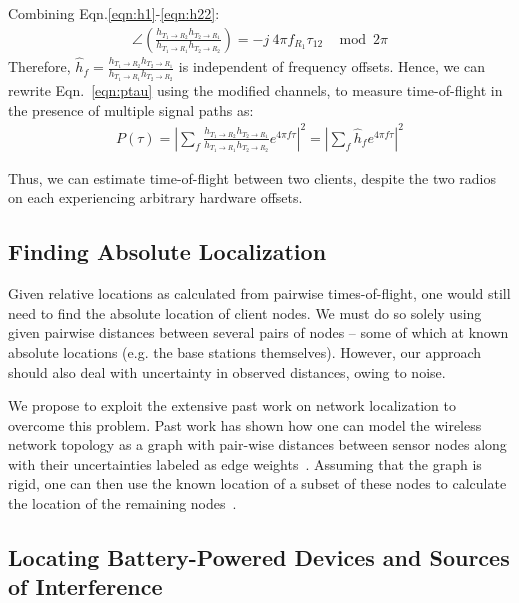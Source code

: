 Combining Eqn.\ref{eqn:h1}-\ref{eqn:h22}:
\begin{align}
\angle \left(\frac{h_{T_1 \rightarrow R_2} h_{T_2 \rightarrow R_1}}{h_{T_1 \rightarrow R_1} h_{T_2 \rightarrow R_2}} \right) = -j~4 \pi f_{R_1} \tau_{12} ~~\mod 2\pi \label{eqn:h4}
\end{align}
Therefore,  $\hat{h}_f = \frac{h_{T_1 \rightarrow R_2} h_{T_2 \rightarrow R_1}}{h_{T_1 \rightarrow R_1} h_{T_2 \rightarrow R_2}}$ is independent of frequency offsets. Hence, we can rewrite Eqn.~\ref{eqn:ptau} using the modified channels, to measure time-of-flight in the presence of multiple signal paths as:
\begin{align}
P(\tau) = \left|\sum_f \frac{h_{T_1 \rightarrow R_2} h_{T_2 \rightarrow R_1}}{h_{T_1 \rightarrow R_1} h_{T_2 \rightarrow R_2}} e^{4 \pi f \tau}\right|^2 =  \left|\sum_f \hat{h}_f e^{4 \pi f \tau}\right|^2\label{eqn:ptau2}
\end{align}

Thus, we can estimate time-of-flight between two clients, despite the two radios on each experiencing arbitrary hardware offsets. 


\subsection{Finding Absolute Localization}\label{sec:localization-abs}
Given relative locations as calculated from pairwise times-of-flight, one would still need to find the absolute location of client nodes. We must do so solely using given pairwise distances between several pairs of nodes -- some of which at known absolute locations (e.g. the base stations themselves). However, our approach should also deal with uncertainty in observed distances, owing to  noise. 

We propose to exploit the extensive past work on network localization to overcome this problem. Past work has shown how one can model the wireless network topology as a graph with pair-wise distances between sensor nodes along with their uncertainties labeled as edge weights~\cite{nwlocalization}. Assuming that the graph is rigid, one can then use the known location of a subset of these nodes to calculate the location of the remaining nodes~\cite{sethnwlocalization}.


\subsection{Locating Battery-Powered Devices and Sources of Interference}\label{sec:localization-inter}


